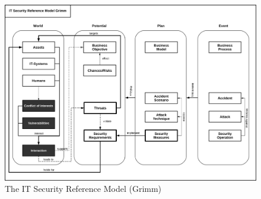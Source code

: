 \begin{figure}
\centering
\includegraphics[width=\textwidth]{diagrams/png/itsec-ref-model-grimm.png}
\caption{The IT Security Reference Model (Grimm)}
\end{figure}
